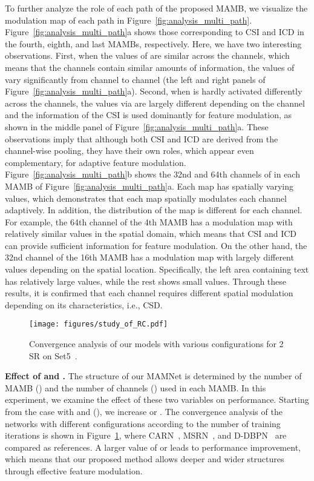 \documentclass[final,5p,times,twocolumn]{elsarticle}
\begin{document}
To further analyze the role of each path of the proposed MAMB, we visualize the modulation map of each path in Figure~\ref{fig:analysis_multi_path}.
Figure~\ref{fig:analysis_multi_path}a shows those corresponding to CSI and ICD in the fourth, eighth, and last MAMBs, respectively.
Here, we have two interesting observations.
First, when the values of  are similar across the channels, which means that the channels contain similar amounts of information, the values of  vary significantly from channel to channel (the left and right panels of Figure~\ref{fig:analysis_multi_path}a).
Second, when  is hardly activated differently across the channels, the values via  are largely different depending on the channel and the information of the CSI is used dominantly for feature modulation, as shown in the middle panel of Figure~\ref{fig:analysis_multi_path}a.
These observations imply that although both CSI and ICD are derived from the channel-wise pooling, they have their own roles, which appear even complementary, for adaptive feature modulation.
Figure~\ref{fig:analysis_multi_path}b shows the 32nd and 64th channels of  in each MAMB of Figure~\ref{fig:analysis_multi_path}a.
Each map has spatially varying values, which demonstrates that each map spatially modulates each channel adaptively.
In addition, the distribution of the map is different for each channel.
For example, the 64th channel of the 4th MAMB has a modulation map with relatively similar values in the spatial domain, which means that CSI and ICD can provide sufficient information for feature modulation.
On the other hand, the 32nd channel of the 16th MAMB has a modulation map with largely different values depending on the spatial location.
Specifically, the left area containing text has relatively large values, while the rest shows small values.
Through these results, it is confirmed that each channel requires different spatial modulation depending on its characteristics, i.e., CSD.

\begin{figure}[t]
	\centering
	\texttt{[image: figures/study\_of\_RC.pdf]}
	\caption{Convergence analysis of our models with various configurations for 
	2 SR on Set5~\cite{bevilacqua2012low}.}
	\label{fig:study}
\end{figure}

\textbf{Effect of  and .}
The structure of our MAMNet is determined by the number of MAMB () and the number of channels () used in each MAMB.
In this experiment, we examine the effect of these two variables on performance.
Starting from the case with  and  (), we increase  or .
The convergence analysis of the networks with different configurations according to the number of training iterations is shown in Figure~\ref{fig:study}, where CARN~\cite{ahn2018fast}, MSRN~\cite{li2018multi}, and D-DBPN~\cite{haris2018deep} are compared as references.
A larger value of  or  leads to performance improvement, which means that our proposed method allows deeper and wider structures through effective feature modulation.
\end{document}
